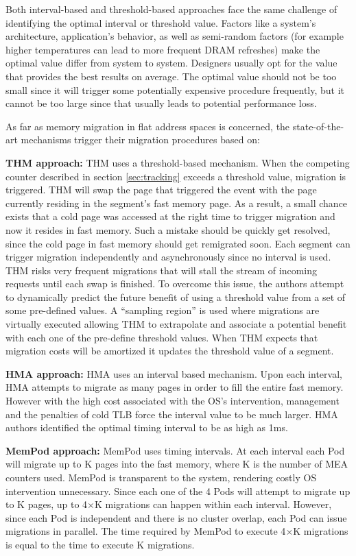 Both interval-based and threshold-based approaches face the same challenge of identifying the optimal interval or threshold value. Factors like a system's architecture, application's behavior, as well as semi-random factors (for example higher temperatures can lead to more frequent DRAM refreshes) make the optimal value differ from system to system. Designers usually opt for the value that provides the best results on average. The optimal value should not be too small since it will trigger some potentially expensive procedure frequently, but it cannot be too large since that usually leads to potential performance loss. 

As far as memory migration in flat address spaces is concerned, the state-of-the-art mechanisms trigger their migration procedures based on:

	\textbf{THM approach:} THM uses a threshold-based mechanism. When the competing counter described in section \ref{sec:tracking} exceeds a threshold value, migration is triggered. THM will swap the page that triggered the event with the page currently residing in the segment's fast memory page. As a result, a small chance exists that a cold page was accessed at the right time to trigger migration and now it resides in fast memory. Such a mistake should be quickly get resolved, since the cold page in fast memory should get remigrated soon. Each segment can trigger migration independently and asynchronously since no interval is used. THM risks very frequent migrations that will stall the stream of incoming requests until each swap is finished. To overcome this issue, the authors attempt to dynamically predict the future benefit of using a threshold value from a set of some pre-defined values. A ``sampling region'' is used where migrations are virtually executed allowing THM to extrapolate and associate a potential benefit with each one of the pre-define threshold values. When THM expects that migration costs will be amortized it updates the threshold value of a segment.
	
	\textbf{HMA approach:} HMA uses an interval based mechanism. Upon each interval, HMA attempts to migrate as many pages in order to fill the entire fast memory. However with the high cost associated with the OS's intervention, management and the penalties of cold TLB force the interval value to be much larger. HMA authors identified the optimal timing interval to be as high as 1ms.
	
	\textbf{MemPod approach:} MemPod uses timing intervals. At each interval each Pod will migrate up to K pages into the fast memory, where K is the number of MEA counters used. MemPod is transparent to the system, rendering costly OS intervention unnecessary. Since each one of the 4 Pods will attempt to migrate up to K pages, up to 4$\times$K migrations can happen within each interval. However, since each Pod is independent and there is no cluster overlap, each Pod can issue migrations in parallel. The time required by MemPod to execute 4$\times$K migrations is equal to the time to execute K migrations.
	

